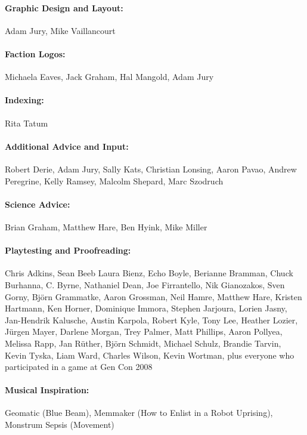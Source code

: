 \paragraph{Graphic Design and Layout:}
\label{sec:graph-design-layo}
Adam Jury, Mike Vaillancourt

\paragraph{Faction Logos:}
\label{sec:faction-logos}
Michaela Eaves, Jack Graham, Hal Mangold, Adam Jury

\paragraph{Indexing:}
\label{sec:indexing}
Rita Tatum

\paragraph{Additional Advice and Input:}
\label{sec:addit-advice-input}
Robert Derie, Adam Jury, Sally Kats, Christian Lonsing, Aaron Pavao,
Andrew Peregrine, Kelly Ramsey, Malcolm Shepard, Marc Szodruch

\paragraph{Science Advice:}
\label{sec:science-advice}
Brian Graham, Matthew Hare, Ben Hyink, Mike Miller

\paragraph{Playtesting and Proofreading:}
\label{sec:playt-proofr}
Chris Adkins, Sean Beeb Laura Bienz, Echo Boyle, Berianne Bramman,
Chuck Burhanna, C. Byrne, Nathaniel Dean, Joe Firrantello, Nik
Gianozakos, Sven Gorny, Björn Grammatke, Aaron Grossman, Neil Hamre,
Matthew Hare, Kristen Hartmann, Ken Horner, Dominique Immora, Stephen
Jarjoura, Lorien Jasny, Jan-Hendrik Kalusche, Austin Karpola, Robert
Kyle, Tony Lee, Heather Lozier, Jürgen Mayer, Darlene Morgan, Trey
Palmer, Matt Phillips, Aaron Pollyea, Melissa Rapp, Jan Rüther, Björn
Schmidt, Michael Schulz, Brandie Tarvin, Kevin Tyska, Liam Ward,
Charles Wilson, Kevin Wortman, plus everyone who participated in a
game at Gen Con 2008

\paragraph{Musical Inspiration:}
\label{sec:musical-inspiration}
Geomatic (Blue Beam), Memmaker (How to Enlist in a Robot Uprising),
Monstrum Sepsis (Movement)

